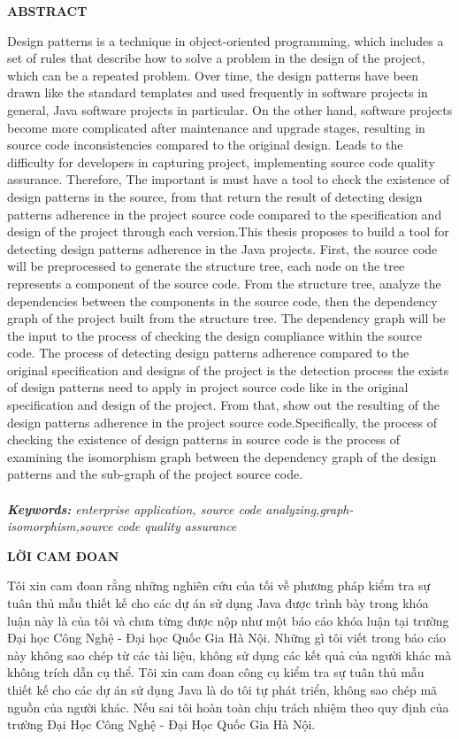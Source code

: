 \documentclass[12pt]{report}
\begin{document}
\newpage
\begin{center}
	\textbf{\large ABSTRACT}
\end{center}
Design patterns is a technique in object-oriented programming, which includes a set of rules that describe how to solve a problem in the design of the project, which can be a repeated problem. Over time, the design patterns have been drawn like the standard templates and used frequently in software projects in general, Java software projects in particular. On the other hand, software projects become more complicated after maintenance and upgrade stages,  resulting in source code inconsistencies compared to the original design. Leads to the difficulty for developers in capturing project, implementing source code quality assurance. Therefore, The important is must have a tool to check the existence of design patterns in the source, from that return the result of detecting design patterns adherence in the project source code compared to the specification and design of the project through each version.This thesis proposes to build a tool for detecting design patterns adherence in the Java projects. First, the source code will be preprocessed to generate the structure tree, each node on the tree represents a component of the source code. From the structure tree, analyze the dependencies between the components in the source code, then the dependency graph of the project built from the structure tree. The dependency graph will be the input to the process of checking the design compliance within the source code. The process of detecting design patterns adherence compared to the original specification and designs of the project is the detection process the exists of design patterns need to apply in project source code like in the original specification and design of the project. From that,  show out the resulting of the design patterns adherence in the project source code.Specifically, the process of checking the existence of design patterns in source code is the process of examining the isomorphism graph between the dependency graph of the design patterns and the sub-graph of the project source code.\\\\
\noindent \textit{\textbf{Keywords:} enterprise application, source code analyzing,graph-isomorphism,source code quality assurance}

\newpage
\begin{center}
	\textbf{\large LỜI CAM ĐOAN}
\end{center}
Tôi xin cam đoan rằng những nghiên cứu của tối về phương pháp kiểm tra sự tuân thủ mẫu thiết kế cho các dự án sử dụng Java được trình bày trong khóa luận này là của tôi và chưa từng được nộp như một báo cáo khóa luận tại trường Đại học Công Nghệ - Đại học Quốc Gia Hà Nội. Những gì tôi viết trong báo cáo này không sao chép từ các tài liệu, không sử dụng các kết quả của người khác mà không trích dẫn cụ thể. Tôi xin cam đoan công cụ kiểm tra sự tuân thủ mẫu thiết kế cho các dự án sử dụng Java là do tôi tự phát triển, không sao chép mã nguồn của người khác. Nếu sai tôi hoàn toàn chịu trách nhiệm theo quy định của trường Đại Học Công Nghệ - Đại Học Quốc Gia Hà Nội.
\end{document}
